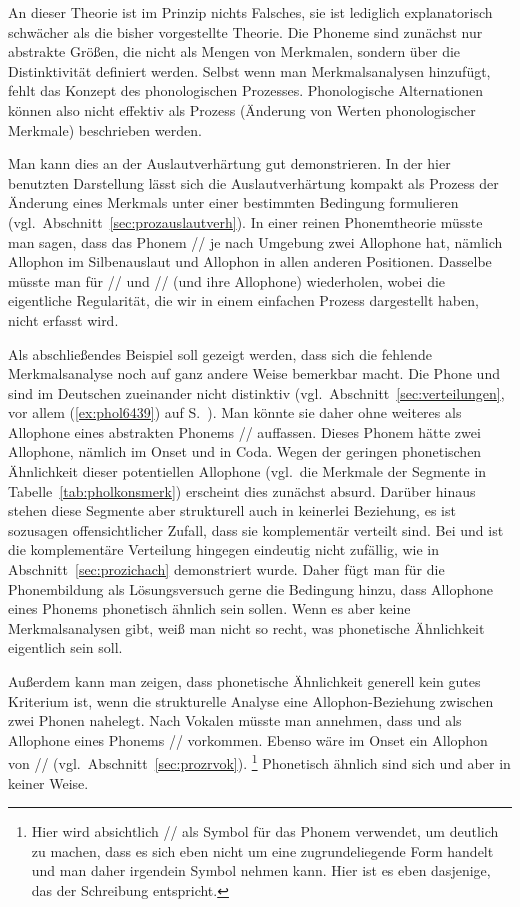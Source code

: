 An dieser Theorie ist im Prinzip nichts Falsches, sie ist lediglich explanatorisch schwächer als die bisher vorgestellte Theorie.
Die Phoneme sind zunächst nur abstrakte Größen, die nicht als Mengen von Merkmalen, sondern über die Distinktivität definiert werden.
Selbst wenn man Merkmalsanalysen hinzufügt, fehlt das Konzept des phonologischen Prozesses.
Phonologische Alternationen können also nicht effektiv als Prozess (Änderung von Werten phonologischer Merkmale) beschrieben werden.

Man kann dies an der Auslautverhärtung gut demonstrieren.
In der hier benutzten Darstellung lässt sich die Auslautverhärtung kompakt als Prozess der Änderung eines Merkmals unter einer bestimmten Bedingung formulieren (vgl.\ Abschnitt~\ref{sec:prozauslautverh}).
In einer reinen Phonemtheorie müsste man sagen, dass das Phonem // je nach Umgebung zwei Allophone hat, nämlich Allophon \textipa{[p]} im Silbenauslaut und Allophon \textipa{[b]} in allen anderen Positionen.
Dasselbe müsste man für // und // (und ihre Allophone) wiederholen, wobei die eigentliche Regularität, die wir in einem einfachen Prozess dargestellt haben, nicht erfasst wird.

Als abschließendes Beispiel soll gezeigt werden, dass sich die fehlende Merk\-mals\-ana\-lyse noch auf ganz andere Weise bemerkbar macht.
Die Phone \textipa{[h]} und \textipa{[N]} sind im Deutschen zueinander nicht distinktiv (vgl.\ Abschnitt~\ref{sec:verteilungen}, vor allem (\ref{ex:phol6439}) auf S.~\pageref{ex:phol6439}).
Man könnte sie daher ohne weiteres als Allophone eines abstrakten Phonems // auffassen.
Dieses Phonem hätte zwei Allophone, nämlich \textipa{[h]} im Onset und \textipa{[N]} in Coda.
Wegen der geringen phonetischen Ähnlichkeit dieser potentiellen Allophone (vgl.\ die Merkmale der Segmente in Tabelle~\ref{tab:pholkonsmerk}) erscheint dies zunächst absurd.
Darüber hinaus stehen diese Segmente aber strukturell auch in keinerlei Beziehung, es ist sozusagen offensichtlicher Zufall, dass sie komplementär verteilt sind.
Bei \textipa{[\c{c}]} und \textipa{[X]} ist die komplementäre Verteilung hingegen eindeutig nicht zufällig, wie in Abschnitt~\ref{sec:prozichach} demonstriert wurde.
Daher fügt man für die Phonembildung als Lösungsversuch gerne die Bedingung hinzu, dass Allophone eines Phonems phonetisch ähnlich sein sollen.
Wenn es aber keine Merkmalsanalysen gibt, weiß man nicht so recht, was phonetische Ähnlichkeit eigentlich sein soll.

Außerdem kann man zeigen, dass phonetische Ähnlichkeit generell kein gutes Kriterium ist, wenn die strukturelle Analyse eine Allophon-Beziehung zwischen zwei Phonen nahelegt.
Nach Vokalen müsste man \zB annehmen, dass \textipa{[@]} und \textipa{[5]} als Allophone eines Phonems // vorkommen.
Ebenso wäre im Onset \textipa{[K]} ein Allophon von // (vgl.\ Abschnitt~\ref{sec:prozrvok}).%
\footnote{Hier wird absichtlich // als Symbol für das Phonem verwendet, um deutlich zu machen, dass es sich eben nicht um eine zugrundeliegende Form handelt und man daher irgendein Symbol nehmen kann.
Hier ist es eben dasjenige, das der Schreibung entspricht.}
Phonetisch ähnlich sind sich \textipa{[@]} und \textipa{[K]} aber in keiner Weise.

